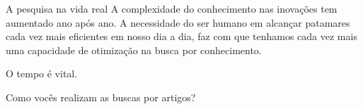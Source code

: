 \begin{frame}[t]{A pesquisa na vida real} 
    \transdissolve[duration=0.5]
    A complexidade do conhecimento nas inovações tem aumentado ano após ano. A necessidade do ser humano em alcançar patamares cada vez mais eficientes em nosso dia a dia, faz com que tenhamos cada vez mais uma capacidade de otimização na busca por conhecimento.

    \centering
    \vspace*{0.1cm}
    \Large{O tempo é vital.}


\end{frame}
\begin{frame}[c]{Como vocês realizam as buscas por artigos?} 
    \transdissolve[duration=0.5]
   
    \begin{center}
    \end{center}
\end{frame}
